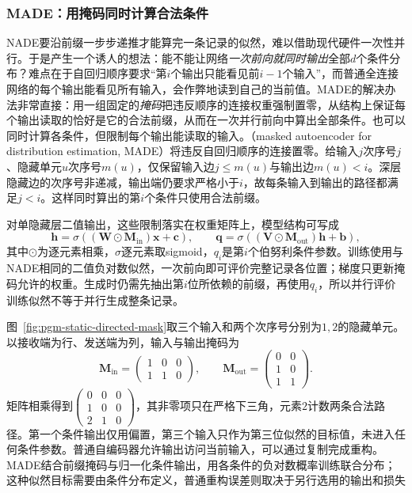 \subsubsection{MADE：用掩码同时计算合法条件}
\label{sec:pgm-static-directed-made-model}

NADE要沿前缀一步步递推才能算完一条记录的似然，难以借助现代硬件一次性并行。于是产生一个诱人的想法：能不能让网络\emph{一次前向就同时输出}全部$d$个条件分布？难点在于自回归顺序要求“第$i$个输出只能看见前$i-1$个输入”，而普通全连接网络的每个输出能看见所有输入，会作弊地读到自己的当前值。MADE的解决办法非常直接：用一组固定的\emph{掩码}把违反顺序的连接权重强制置零，从结构上保证每个输出读取的恰好是它的合法前缀，从而在一次并行前向中算出全部条件。也可以同时计算各条件，但限制每个输出能读取的输入。（masked autoencoder for distribution estimation, MADE）将违反自回归顺序的连接置零。给输入$j$次序号$j$、隐藏单元$u$次序号$m(u)$，仅保留输入边$j\le m(u)$与输出边$m(u)<i$。深层隐藏边的次序号非递减，输出端仍要求严格小于$i$，故每条输入到输出的路径都满足$j<i$。这样同时算出的第$i$个条件只使用合法前缀。

对单隐藏层二值输出，这些限制落实在权重矩阵上，模型结构可写成
\begin{equation}
  \bm h=\sigma((\bm W\odot\bm M_{\mathrm{in}})\bm x+\bm c),
  \qquad
  \bm q=\sigma((\bm V\odot\bm M_{\mathrm{out}})\bm h+\bm b),
  \label{eq:pgm-static-directed-made-structure}
\end{equation}
其中$\odot$为逐元素相乘，$\sigma$逐元素取sigmoid，$q_i$是第$i$个伯努利条件参数。训练使用与NADE相同的二值负对数似然，一次前向即可评价完整记录各位置；梯度只更新掩码允许的权重。生成时仍需先抽出第$i$位所依赖的前缀，再使用$q_i$，所以并行评价训练似然不等于并行生成整条记录。

图~\ref{fig:pgm-static-directed-mask}取三个输入和两个次序号分别为$1,2$的隐藏单元。以接收端为行、发送端为列，输入与输出掩码为
\[
  \bm{M}_{\mathrm{in}}=
  \begin{pmatrix}1&0&0\\1&1&0\end{pmatrix},\qquad
  \bm{M}_{\mathrm{out}}=
  \begin{pmatrix}0&0\\1&0\\1&1\end{pmatrix}.
\]
矩阵相乘得到$\left(\begin{smallmatrix}0&0&0\\1&0&0\\2&1&0\end{smallmatrix}\right)$，其非零项只在严格下三角，元素$2$计数两条合法路径。第一个条件输出仅用偏置，第三个输入只作为第三位似然的目标值，未进入任何条件参数。普通自编码器允许输出访问当前输入，可以通过复制完成重构。MADE结合前缀掩码与归一化条件输出，用各条件的负对数概率训练联合分布；这种似然目标需要由条件分布定义，普通重构误差则取决于另行选用的输出和损失

